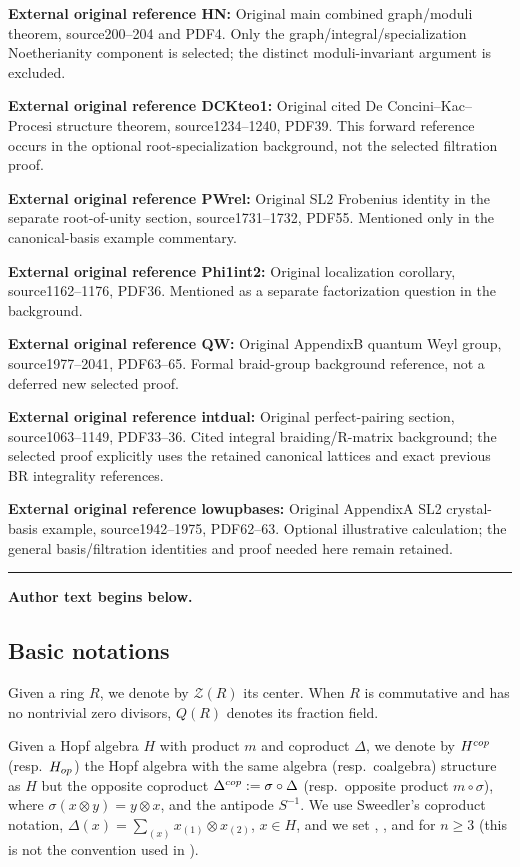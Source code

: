 \documentclass[11pt]{article}
\numberwithin{equation}{section}
\numberwithin{equation}{section}
\theoremstyle{definition}
\begin{document}
\noindent\textbf{External original reference HN:} Original main combined graph/moduli theorem, source200–204 and PDF4. Only the graph/integral/specialization Noetherianity component is selected; the distinct moduli-invariant argument is excluded.\par
\noindent\textbf{External original reference DCKteo1:} Original cited De Concini–Kac–Procesi structure theorem, source1234–1240, PDF39. This forward reference occurs in the optional root-specialization background, not the selected filtration proof.\par
\noindent\textbf{External original reference PWrel:} Original SL2 Frobenius identity in the separate root-of-unity section, source1731–1732, PDF55. Mentioned only in the canonical-basis example commentary.\par
\noindent\textbf{External original reference Phi1int2:} Original localization corollary, source1162–1176, PDF36. Mentioned as a separate factorization question in the background.\par
\noindent\textbf{External original reference QW:} Original AppendixB quantum Weyl group, source1977–2041, PDF63–65. Formal braid-group background reference, not a deferred new selected proof.\par
\noindent\textbf{External original reference intdual:} Original perfect-pairing section, source1063–1149, PDF33–36. Cited integral braiding/R-matrix background; the selected proof explicitly uses the retained canonical lattices and exact previous BR integrality references.\par
\noindent\textbf{External original reference lowupbases:} Original AppendixA SL2 crystal-basis example, source1942–1975, PDF62–63. Optional illustrative calculation; the general basis/filtration identities and proof needed here remain retained.\par
\medskip\hrule\medskip\noindent\textbf{Author text begins below.}\par
\setcounter{section}{1}\setcounter{subsection}{1}
\subsection{Basic notations} Given a ring $R$, we denote by $\mathcal{Z}(R)$ its center. When $R$ is commutative and has no nontrivial zero divisors, $Q(R)$ denotes its fraction field.

Given a Hopf algebra $H$ with product $m$ and coproduct $\Delta$, we denote by $H^{\rm cop}$ (resp.~$H_{\rm op}$) the Hopf algebra with the same algebra (resp.\ coalgebra) structure as $H$ but the opposite coproduct $\Delta^{\rm cop}:=\sigma \circ {\Delta}$ (resp.\ opposite product $m\circ \sigma$), where $\sigma(x\otimes y) = y\otimes x$, and the antipode ${S}^{-1}$. We use Sweedler's coproduct notation, $ \Delta(x) = \sum_{(x)}x_{(1)} \otimes x_{(2)}$, $x\in H$, and we set , , and  for $n\geq 3$ (this is not the convention used in \cite{BR}).
\end{document}
